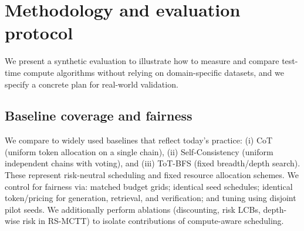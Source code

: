 \section{Methodology and evaluation protocol}

We present a synthetic evaluation to illustrate how to measure and compare test-time compute algorithms without relying on domain-specific datasets, and we specify a concrete plan for real-world validation.

\subsection{Baseline coverage and fairness}
We compare to widely used baselines that reflect today’s practice: (i) CoT (uniform token allocation on a single chain), (ii) Self-Consistency \cite{wang2023selfconsistency} (uniform independent chains with voting), and (iii) ToT-BFS \cite{yao2023tot} (fixed breadth/depth search). These represent risk-neutral scheduling and fixed resource allocation schemes. We control for fairness via: matched budget grids; identical seed schedules; identical token/pricing for generation, retrieval, and verification; and tuning using disjoint pilot seeds. We additionally perform ablations (discounting, risk LCBs, depth-wise risk in RS-MCTT) to isolate contributions of compute-aware scheduling.

